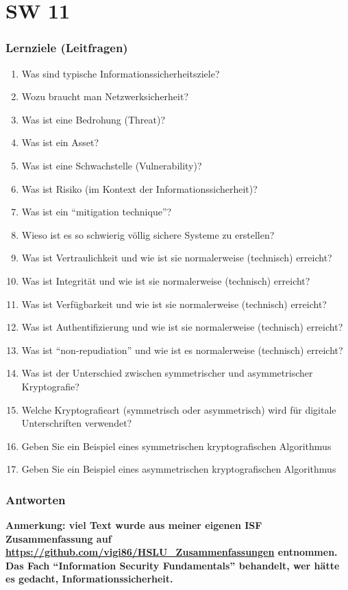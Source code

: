 \part{SW 11}
\section{Lernziele (Leitfragen)}
\begin{enumerate}
    \item Was sind typische Informationssicherheitsziele?
    \item Wozu braucht man Netzwerksicherheit?
    \item Was ist eine Bedrohung (Threat)?
    \item Was ist ein Asset?
    \item Was ist eine Schwachstelle (Vulnerability)?
    \item Was ist Risiko (im Kontext der Informationssicherheit)?
    \item Was ist ein "`mitigation technique"'?
    \item Wieso ist es so schwierig völlig sichere Systeme zu erstellen?
    \item Was ist Vertraulichkeit und wie ist sie normalerweise (technisch) erreicht?
    \item Was ist Integrität und wie ist sie normalerweise (technisch) erreicht?
    \item Was ist Verfügbarkeit und wie ist sie normalerweise (technisch) erreicht?
    \item Was ist Authentifizierung und wie ist sie normalerweise (technisch) erreicht?
    \item Was ist "`non-repudiation"' und wie ist es normalerweise (technisch) erreicht?
    \item Was ist der Unterschied zwischen symmetrischer und asymmetrischer Kryptografie?
    \item Welche Kryptografieart (symmetrisch oder asymmetrisch) wird für digitale Unterschriften verwendet?
    \item Geben Sie ein Beispiel eines symmetrischen kryptografischen Algorithmus
    \item Geben Sie ein Beispiel eines asymmetrischen kryptografischen Algorithmus
\end{enumerate}

\section{Antworten}
{\color{teal}\textsf{\textbf{Anmerkung: viel Text wurde aus meiner eigenen ISF Zusammenfassung auf \\\url{https://github.com/vigi86/HSLU_Zusammenfassungen} entnommen. Das Fach "`Information Security Fundamentals"' behandelt, wer hätte es gedacht, Informationssicherheit.}}}

